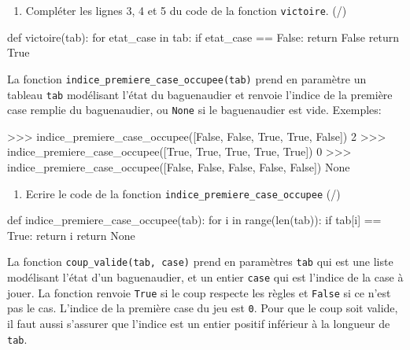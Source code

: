         \begin{enumerate}[resume=monDS]
\item Compléter les lignes 3, 4 et 5 du code de la fonction \texttt{victoire}.  (/)
\end{enumerate}

\begin{blocvisible}[height=4]
    \begin{CodePythontexAlt}[TaillePolice=\large, Largeur=1\linewidth,Centre,Lignes=true,PremLigne=1]{}
    def victoire(tab):
        for etat_case in tab:
            if etat_case == False:
                return False
        return True
    \end{CodePythontexAlt}
\end{blocvisible}

\medskip

 La fonction \verb|indice_premiere_case_occupee(tab)| prend en paramètre un tableau \texttt{tab} modélisant l'état du baguenaudier et renvoie l'indice de la première case remplie du baguenaudier, ou \texttt{None} si le baguenaudier est vide. Exemples:

    \begin{CodePythontexAlt}[TaillePolice=\large, Largeur=1\linewidth,Centre,Lignes=true,PremLigne=1]{}
>>> indice_premiere_case_occupee([False, False, True, True, False])
2
>>> indice_premiere_case_occupee([True, True, True, True, True])
0
>>> indice_premiere_case_occupee([False, False, False, False, False])
None
    \end{CodePythontexAlt}

    \begin{enumerate}[resume=monDS]
\item Ecrire le code de la fonction \verb|indice_premiere_case_occupee| (/)
\end{enumerate}

\begin{blocvisible}[height=6]
    \begin{CodePythontexAlt}[TaillePolice=\large, Largeur=1\linewidth,Centre,Lignes=true,PremLigne=1]{}
    def indice_premiere_case_occupee(tab):
        for i in range(len(tab)):
            if tab[i] == True:
                return i
        return None
    \end{CodePythontexAlt}
\end{blocvisible}

\pagebreak


 La fonction \verb|coup_valide(tab, case)| prend en paramètres \texttt{tab} qui est une liste modélisant l'état d'un baguenaudier, et un entier \texttt{case} qui est l'indice de la case à jouer. La fonction renvoie \texttt{True} si le coup respecte les règles et \texttt{False} si ce n'est pas le cas. L'indice de la première case du jeu est \texttt{0}. Pour que le coup soit valide, il faut aussi s'assurer que l'indice est un entier positif inférieur à la longueur de \texttt{tab}.


